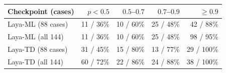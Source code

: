 \begin{tabular}{lrrrr}
\toprule
Checkpoint (cases) & $p<0.5$ & $0.5$--$0.7$ & $0.7$--$0.9$ & $\geq 0.9$ \\
\midrule
Laya-ML (88 cases) & 11 / 36\% & 10 / 60\% & 25 / 48\% & 42 / 88\% \\
Laya-ML (all 144) & 11 / 36\% & 10 / 60\% & 25 / 48\% & 98 / 95\% \\
Laya-TD (88 cases) & 31 / 45\% & 15 / 80\% & 13 / 77\% & 29 / 100\% \\
Laya-TD (all 144) & 60 / 72\% & 22 / 86\% & 24 / 88\% & 38 / 100\% \\
\bottomrule
\end{tabular}
